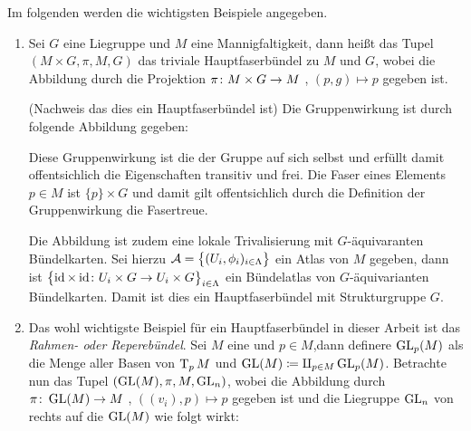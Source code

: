 Im folgenden werden die wichtigsten Beispiele angegeben.

\begin{Bsp}
  \begin{enumerate}[1)]
  \item Sei $G$ eine Liegruppe und $M$ eine Mannigfaltigkeit, dann
    heißt das Tupel $(M \times G, \pi, M, G)$ das triviale
    Hauptfaserbündel zu $M$ und $G$, wobei die Abbildung durch die
    Projektion $\pi \colon M \times G \rightarrow M$ , $(p,g) \mapsto p$ gegeben
    ist.
    \begin{smallproof}(Nachweis das dies ein Hauptfaserbündel ist) Die
      Gruppenwirkung ist durch folgende Abbildung gegeben:
		
      Diese Gruppenwirkung ist die der Gruppe auf sich selbst und
      erfüllt damit offentsichlich die Eigenschaften transitiv und
      frei. Die Faser eines Elements $p\in M$ ist $\{p\}\times G$ und
      damit gilt offentsichlich durch die Definition der
      Gruppenwirkung die Fasertreue.
		
      Die Abbildung ist zudem eine lokale Trivalisierung mit
      $G$-äquivaranten Bündelkarten. Sei hierzu
      $\mathcal{A}=\bigl\{ (U_i,\phi_i)_{i \in \Lambda} \bigr\}$ ein Atlas von
      $M$ gegeben, dann ist
      $ \bigl\{ \operatorname{id}\times\operatorname{id} \colon U_i \times G \rightarrow U_i\times G \bigr\}_{i \in
        \Lambda} $
      ein Bündelatlas von $G$-äquivarianten Bündelkarten.  Damit ist
      dies ein Hauptfaserbündel mit Strukturgruppe $G$.
		\end{smallproof}
		
              \item Das wohl wichtigste Beispiel für ein
                Hauptfaserbündel in dieser Arbeit ist das
                \textit{Rahmen- oder Reperebündel}. Sei $M$ eine \mfg
                und $p \in M$,dann definere $\operatorname{GL}_p(M)$ als die Menge
                aller Basen von $\operatorname{T}_{p}M$ und
                $\operatorname{GL}(M) \coloneqq \amalg_{p \in M} \operatorname{GL}_p(M)$.
                Betrachte nun das Tupel $(\operatorname{GL}(M),\pi,M,\operatorname{GL}_n)$, wobei
                die Abbildung durch $\pi \colon \operatorname{GL}(M) \rightarrow M$ ,
                $((v_i),p) \mapsto p$ gegeben ist und die Liegruppe
                $\operatorname{GL}_n$ von rechts auf die \mfg $\operatorname{GL}(M)$ wie folgt
                wirkt:
		\begin{center}
		\end{center}
		\begin{smallproof}
			

\end{smallproof}
\end{enumerate}
\end{Bsp}
